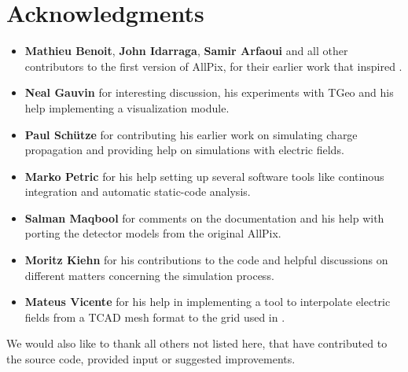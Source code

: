 \section{Acknowledgments}
\begin{itemize}
\item \textbf{Mathieu Benoit}, \textbf{John Idarraga}, \textbf{Samir Arfaoui} and all other contributors to the first version of AllPix, for their earlier work that inspired \apsq.
\item \textbf{Neal Gauvin} for interesting discussion, his experiments with TGeo and his help implementing a visualization module.
\item \textbf{Paul Sch\"utze} for contributing his earlier work on simulating charge propagation and providing help on simulations with electric fields.
\item \textbf{Marko Petric} for his help setting up several software tools like continous integration and automatic static-code analysis.
\item \textbf{Salman Maqbool} for comments on the documentation and his help with porting the detector models from the original AllPix.
\item \textbf{Moritz Kiehn} for his contributions to the code and helpful discussions on different matters concerning the simulation process.
\item \textbf{Mateus Vicente} for his help in implementing a tool to interpolate electric fields from a TCAD mesh format to the grid used in \apsq.
\end{itemize}
We would also like to thank all others not listed here, that have contributed to the source code, provided input or suggested improvements. 
